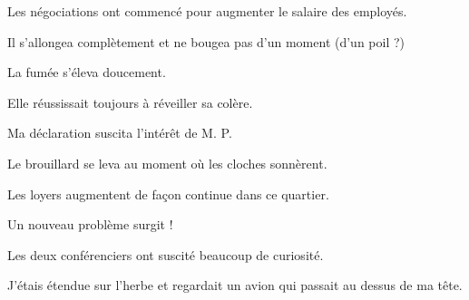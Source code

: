 \documentclass[a4paper,english,bookmarks]{article}
\begin{document}
\begin{enumerate}
    \begin{minipage}{0.45\linewidth}
        \item Les négociations ont commencé pour augmenter le salaire des employés.
    
    
    \item Il s'allongea complètement et ne bougea pas d'un moment (d'un poil ?)
    
    
    \item La fumée s'éleva doucement.
    
    
    \item Elle réussissait toujours à réveiller sa colère.
    
    
    \item Ma déclaration suscita l'intérêt de M. P.
    
    \end{minipage}
    \hfill
    \begin{minipage}{0.45\linewidth}
        \item Le brouillard se leva au moment où les cloches sonnèrent.
    
    
    \item Les loyers augmentent de façon continue dans ce quartier.
    
    
    \item Un nouveau problème surgit !
    
    
    \item Les deux conférenciers ont suscité beaucoup de curiosité.
    
    
    \item J'étais étendue sur l'herbe et regardait un avion qui passait au dessus de ma tête.
    
    \end{minipage}
\end{enumerate}
\end{document}
